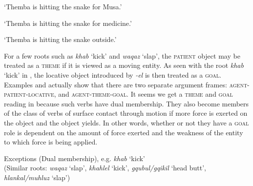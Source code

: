\documentclass[output=paper]{langsci/langscibook}
\begin{document}

\glt ‘Themba is hitting the snake for Musa.’ 


\glt ‘Themba is hitting the snake for medicine.’ 


\glt ‘Themba is hitting the snake outside.’ 
\z
\z

For a few roots such as \textit{khab} ‘kick’ and \textit{waqaz} ‘slap’, the \textsc{patient} object may be treated as a \textsc{theme} if it is viewed as a moving entity. As seen with the root \textit{khab} ‘kick’ in , the locative object introduced by \textit{-el} is then treated as a \textsc{goal}. Examples  and  actually show that there are two separate argument frames: \textsc{agent-patient-locative}, and \textsc{agent-theme-goal}. It seems we get a \textsc{theme} and \textsc{goal} reading in  because such verbs have dual membership. They also become members of the class of verbs of surface contact through motion if more force is exerted on the object and the object yields. In other words, whether or not they have a \textsc{goal} role is dependent on the amount of force exerted and the weakness of the entity to which force is being applied.

\ea\label{ex:sibanda:12}
\settowidth{}
{Exceptions (Dual membership), e.g. \textit{khab} ‘kick’}\\
 (Similar roots: \textit{waqaz} ‘slap’, \textit{khahlel} ‘kick’, \textit{gqubul/gqikil} ‘head butt’, \textit{hlankal/muhluz} ‘slap’)\\
\end{document}
